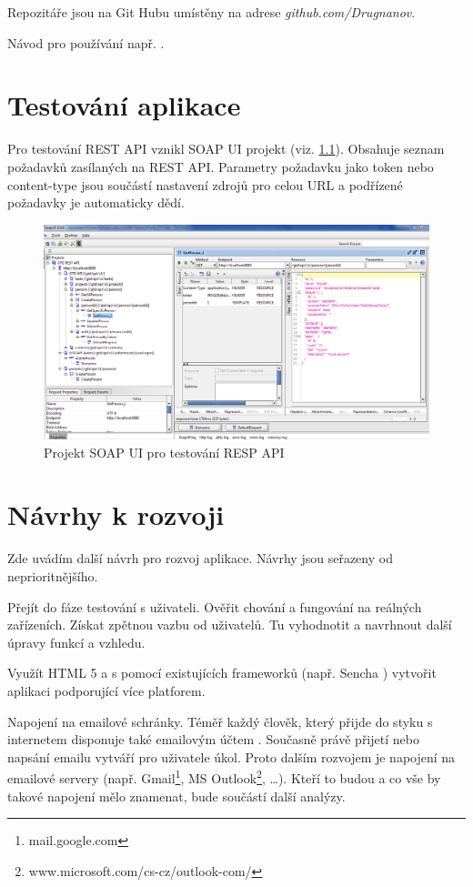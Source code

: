\documentclass[thesis=B,czech]{FITthesis}[2012/06/26]
\begin{document}
Repozitáře jsou na Git Hubu umístěny na adrese \textit{github.com/Drugnanov}.

Návod pro používání např. \cite{github_guide}.

\chapter{Testování aplikace}

Pro testování REST API vznikl SOAP UI\cite{testing_soapui} projekt (viz. \ref{fig:soapui}). Obsahuje seznam požadavků zasílaných na REST API. Parametry požadavku jako token nebo content-type jsou součástí nastavení zdrojů pro celou URL a podřízené požadavky je automaticky dědí. 

\begin{figure}[h!]\centering
	\includegraphics[width=1\textwidth]{pictures/sopaui}
	\caption{Projekt SOAP UI pro testování RESP API}
	\label{fig:soapui}
\end{figure}


\chapter{Návrhy k rozvoji}

Zde uvádím další návrh pro rozvoj aplikace. Návrhy jsou seřazeny od neprioritnějšího.\newline

Přejít do fáze testování s uživateli. Ověřit chování a fungování na reálných zařízeních. Získat zpětnou vazbu od uživatelů. Tu vyhodnotit a navrhnout další úpravy funkcí a vzhledu.  

Využít HTML 5 \cite{todo_html5} a s pomocí existujících frameworků (např. Sencha \cite{todo_sencha}) vytvořit aplikaci podporující více platforem. 

Napojení na emailové schránky. Téměř každý člověk, který přijde do styku s internetem disponuje také emailovým účtem \cite{todo_email_stats}. Současně právě přijetí nebo napsání emailu vytváří pro uživatele úkol. Proto dalším rozvojem je napojení na emailové servery (např. Gmail\footnote{mail.google.com}, MS Outlook\footnote{www.microsoft.com/cs-cz/outlook-com/}, \dots). Kteří to budou a co vše by takové napojení mělo znamenat, bude součástí další analýzy. 
\end{document}
